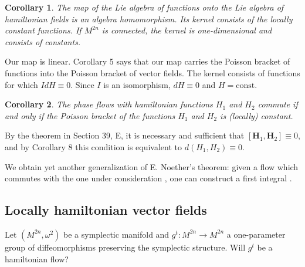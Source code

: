 \documentclass{book}
\numberwithin{equation}{section}
\theoremstyle{plain}
\newtheorem{cor}{Corollary}
\let\oldendproof\endproof
\renewenvironment{proof}[1][\proofname]{%
  \oldproof[\textsc{#1}]%
}{\oldendproof}
\theoremstyle{definition}
\theoremstyle{remark}
\theoremstyle{smallcap}
\numberwithin{prob}{section}
\begin{document}
\begin{cor}
  The map of the Lie algebra of functions
  onto the Lie algebra of hamiltonian fields
  is an algebra homomorphism.
  Its kernel consists of the locally constant
  functions.
  If $M^{2n}$ is connected,
  the kernel is one-dimensional and consists of constants.
\end{cor}


\begin{proof}
  Our map is linear. Corollary 5 says that our map carries
  the Poisson bracket of functions into the Poisson bracket
  of vector fields. The kernel consists of functions
  for which $IdH \equiv 0$.
  Since $I$ is an isomorphism, $dH \equiv 0$ and $H = \mathrm{const}$.
\end{proof}

\begin{cor}
  The phase flows with hamiltonian functions $H_1$ and $H_2$
  commute if and only if the Poisson bracket of the functions
  $H_1$ and $H_2$ is (locally) constant.
\end{cor}

\begin{proof}
  By the theorem in Section 39, E, it is necessary and sufficient
  that $[\mathbf H_1, \mathbf H_2] \equiv 0$,
  and by Corollary 8 this condition is equivalent to
  $d(H_1, H_2) \equiv 0$.
\end{proof}

We obtain yet another generalization of E. Noether's theorem:
given a flow 
which commutes with the one under consideration ,
one can construct a first integral .

\subsection{Locally hamiltonian vector fields}

Let $(M^{2n}, \omega^2)$ be a symplectic manifold and
$g^t: M^{2n} \rightarrow M^{2n}$
a one-parameter group of diffeomorphisms preserving
the symplectic structure.
%
Will $g^t$ be a hamiltonian flow?
\end{document}
